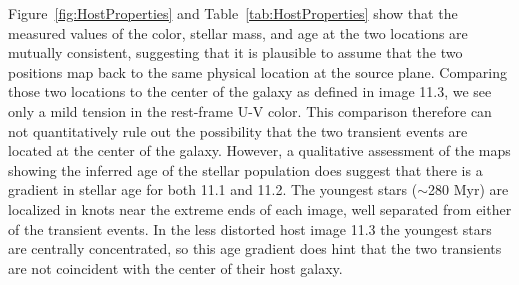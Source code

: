 Figure~\ref{fig:HostProperties} and Table~\ref{tab:HostProperties}
show that the measured values of the color, stellar mass, and age at
the two \spock locations are mutually consistent, suggesting that it
is plausible to assume that the two positions map back to the same
physical location at the source plane.  Comparing those two locations
to the center of the galaxy as defined in image 11.3, we see only a
mild tension in the rest-frame U-V color. This comparison therefore
can not quantitatively rule out the possibility that the two transient
events are located at the center of the galaxy. However, a qualitative
assessment of the maps showing the inferred age of the stellar
population does suggest that there is a gradient in stellar age for
both 11.1 and 11.2.  The youngest stars ($\sim$280 Myr) are localized
in knots near the extreme ends of each image, well separated from
either of the \spock transient events.  In the less distorted host
image 11.3 the youngest stars are centrally concentrated, so this age
gradient does hint that the two transients are not coincident with the
center of their host galaxy.
